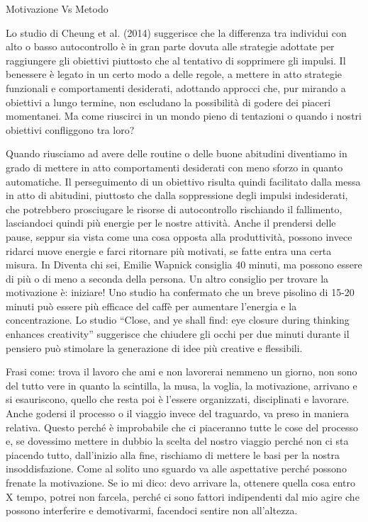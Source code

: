 \documentclass[12pt]{book} %
\begin{document}
\begin{mdframed}[linewidth=1pt]
Motivazione Vs Metodo

Lo studio di Cheung et al. (2014) suggerisce che la differenza tra individui con alto o basso autocontrollo è in gran parte dovuta alle strategie adottate per raggiungere gli obiettivi piuttosto che al tentativo di sopprimere gli impulsi. Il benessere è legato in un certo modo a delle regole, a mettere in atto strategie funzionali e comportamenti desiderati, adottando approcci che, pur mirando a obiettivi a lungo termine, non escludano la possibilità di godere dei piaceri momentanei. Ma come
riuscirci in un mondo pieno di tentazioni o quando i nostri obiettivi confliggono tra loro? 

Quando riusciamo ad avere delle routine o delle buone abitudini diventiamo in grado di mettere in atto comportamenti
desiderati con meno sforzo in quanto automatiche. Il perseguimento di un obiettivo risulta quindi facilitato
dalla messa in atto di abitudini, piuttosto che dalla soppressione degli impulsi indesiderati, che potrebbero prosciugare le
risorse di autocontrollo rischiando il fallimento, lasciandoci quindi più energie per le nostre
attività. Anche il prendersi delle pause, seppur
sia vista come una cosa opposta alla produttività, possono invece ridarci nuove energie e farci ritornare più motivati,
se fatte entra una certa misura. In Diventa chi sei, Emilie Wapnick
consiglia 40 minuti, ma possono essere di più o di meno a seconda della persona. Un altro consiglio per trovare la
motivazione è: iniziare!
Uno studio ha confermato che un breve pisolino di 15-20 minuti può essere più efficace del caffè per aumentare l’energia e la concentrazione.
Lo studio “Close, and ye shall find: eye closure during thinking enhances creativity” suggerisce che chiudere gli occhi per due minuti durante il pensiero può stimolare la generazione di idee più creative e flessibili.

Frasi come: trova il lavoro che ami e non lavorerai nemmeno un giorno, non sono del tutto vere in quanto la scintilla,
la musa, la voglia, la motivazione, arrivano e si esauriscono, quello che resta poi è l'essere organizzati,
disciplinati e lavorare. Anche godersi il processo o il viaggio invece del traguardo, va preso in maniera relativa.
Questo perché è improbabile che ci piaceranno tutte le cose del processo e, se dovessimo mettere in dubbio la scelta
del nostro viaggio perché non ci sta piacendo tutto, dall'inizio alla fine, rischiamo di mettere le basi per la nostra insoddisfazione. Come al solito uno sguardo va alle aspettative perché possono frenate la
motivazione. Se io mi dico: devo arrivare la, ottenere quella cosa entro X tempo, potrei non farcela, perché ci sono
fattori indipendenti dal mio agire che possono interferire e demotivarmi, facendoci sentire non all'altezza.


\end{mdframed}
\end{document}
